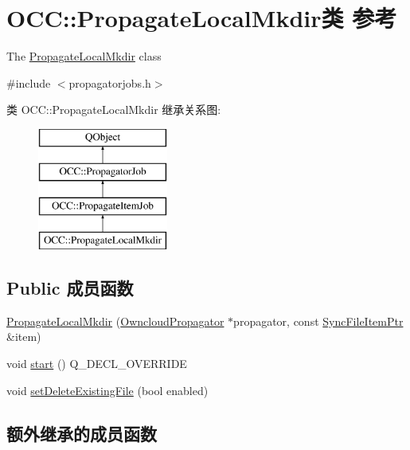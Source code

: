\hypertarget{class_o_c_c_1_1_propagate_local_mkdir}{}\section{O\+CC\+:\+:Propagate\+Local\+Mkdir类 参考}
\label{class_o_c_c_1_1_propagate_local_mkdir}


The \hyperlink{class_o_c_c_1_1_propagate_local_mkdir}{Propagate\+Local\+Mkdir} class  




{\ttfamily \#include $<$propagatorjobs.\+h$>$}

类 O\+CC\+:\+:Propagate\+Local\+Mkdir 继承关系图\+:\begin{figure}[H]
\begin{center}
\leavevmode
\includegraphics[height=4.000000cm]{class_o_c_c_1_1_propagate_local_mkdir}
\end{center}
\end{figure}
\subsection*{Public 成员函数}
\begin{DoxyCompactItemize}
\item 
\hyperlink{class_o_c_c_1_1_propagate_local_mkdir_a230e7a472ec1c7b794a0c0386a780942}{Propagate\+Local\+Mkdir} (\hyperlink{class_o_c_c_1_1_owncloud_propagator}{Owncloud\+Propagator} $\ast$propagator, const \hyperlink{namespace_o_c_c_acb6b0db82893659fbd0c98d3c5b8e2b8}{Sync\+File\+Item\+Ptr} \&item)
\item 
void \hyperlink{class_o_c_c_1_1_propagate_local_mkdir_abfc04efdcf2e09708c31531c2527a767}{start} () Q\+\_\+\+D\+E\+C\+L\+\_\+\+O\+V\+E\+R\+R\+I\+DE
\item 
void \hyperlink{class_o_c_c_1_1_propagate_local_mkdir_a055c0db1cd448f1b0417b42f251450e4}{set\+Delete\+Existing\+File} (bool enabled)
\end{DoxyCompactItemize}
\subsection*{额外继承的成员函数}


